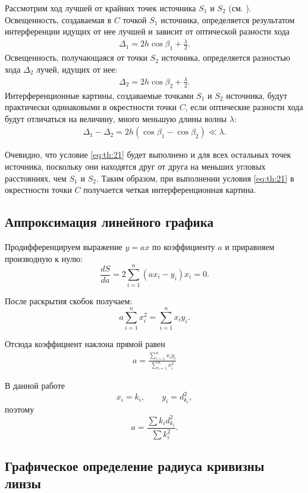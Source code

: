 Рассмотрим ход лучшей от крайних точек источника $S_1$ и $S_2$ (см. ). Освещенность, создаваемая в $C$ точкой $S_1$ источника, определяется результатом интерференции идущих от нее лучшей и зависит от оптической разности хода  
\begin{align} \label{eq:th:19}
	\Delta_1 = 2h \cos \beta_1 + \frac{\lambda}{2}.
\end{align}
Освещенность, получающаяся от точки $S_2$ источника, определяется разностью хода $\Delta_2$ лучей, идущих от нее:
\begin{align} \label{eq:th:20}
	\Delta_2 = 2h \cos \beta_2 + \frac{\lambda}{2}.
\end{align}	
Интерференционные картины, создаваемые точками $S_1$ и $S_2$ источника, будут практически одинаковыми в окрестности точки $C$, если оптические разности хода будут отличаться на величину, много меньшую длины волны $\lambda$:
\begin{align} \label{eq:th:21}
	\Delta_1 - \Delta_2 = 2h (\cos \beta_1 - \cos \beta_2) \ll \lambda.
\end{align}

Очевидно, что условие \cref{eq:th:21} будет выполнено и для всех остальных точек источника, поскольку они находятся друг от друга на меньших угловых расстояниях, чем $S_1$ и $S_2$. Таким образом, при выполнении условия \cref{eq:th:21} в окрестности точки $C$ получается четкая интерференционная картина.






\subsection{Аппроксимация линейного графика}

Продифференцируем выражение $y=ax$ по коэффициенту $a$ и приравняем производную к нулю:
\[
\frac{dS}{da} = 2 \sum_{i=1}^{n} (a x_i - y_i)x_i = 0.
\]

После раскрытия скобок получаем:
\[
a \sum_{i=1}^{n} x_i^2 = \sum_{i=1}^{n} x_i y_i.
\]

Отсюда коэффициент наклона прямой равен
\begin{align} \label{eq:th:25}
	\boxed{a = \frac{\sum\limits_{i=1}^{n} x_i y_i}{\sum\limits_{i=1}^{n} x_i^2}}
\end{align}

В данной работе
\[
x_i = k_i, \qquad y_i = d_{k_i}^2,
\]
поэтому
\[
a = \frac{\sum k_i d_{k_i}^2}{\sum k_i^2}.
\]


\subsection{Графическое определение радиуса кривизны линзы} \label{graf_rad}

